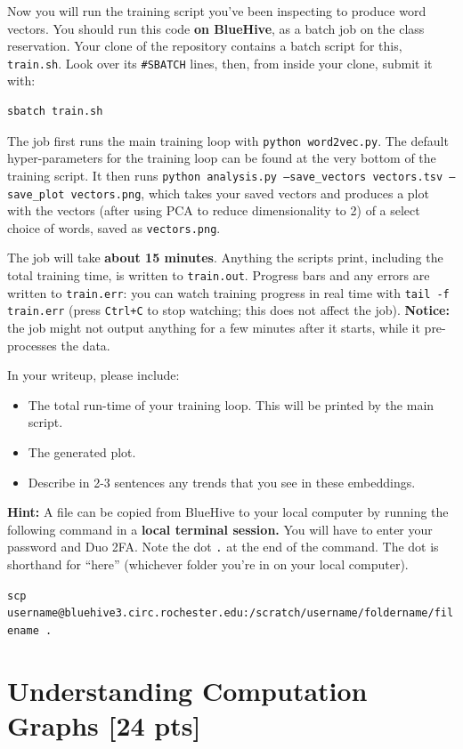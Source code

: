 \documentclass[11pt]{article}
\begin{document}
\newpage
{} Now you will run the training script you've been inspecting to produce word vectors. You should run this code \textbf{on BlueHive}, as a batch job on the class reservation. Your clone of the repository contains a batch script for this, \texttt{train.sh}. Look over its \texttt{\#SBATCH} lines, then, from inside your clone, submit it with:
\begin{verbatim}
sbatch train.sh
\end{verbatim}
The job first runs the main training loop with \texttt{python word2vec.py}. The default hyper-parameters for the training loop can be found at the very bottom of the training script. It then runs \texttt{python analysis.py --save\_vectors vectors.tsv --save\_plot vectors.png}, which takes your saved vectors and produces a plot with the vectors (after using PCA to reduce dimensionality to 2) of a select choice of words, saved as \texttt{vectors.png}.

The job will take \textbf{about 15 minutes}. Anything the scripts print, including the total training time, is written to \texttt{train.out}. Progress bars and any errors are written to \texttt{train.err}: you can watch training progress in real time with \texttt{tail -f train.err} (press \texttt{Ctrl+C} to stop watching; this does not affect the job). \textbf{Notice:} the job might not output anything for a few minutes after it starts, while it pre-processes the data.

\noindent In your writeup, please include:
\begin{itemize}
  \item The total run-time of your training loop.  This will be printed by the main script.
  \item The generated plot.
  \item Describe in 2-3 sentences any trends that you see in these embeddings.
\end{itemize}

\noindent \textbf{Hint:} A file can be copied from BlueHive to your local computer by running the following command in a \textbf{local terminal session.} You will have to enter your password and Duo 2FA. Note the dot \texttt{.} at the end of the command. The dot is shorthand for ``here'' (whichever folder you're in on your local computer).

\noindent \texttt{scp username@bluehive3.circ.rochester.edu:/scratch/username/foldername/filename .}

\section{Understanding Computation Graphs [24 pts]}
\end{document}
